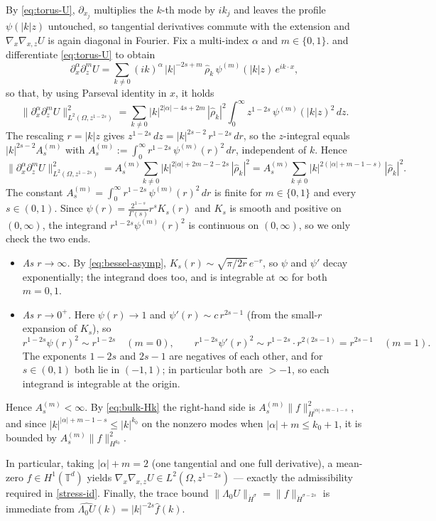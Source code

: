 \documentclass[12pt,a4paper,twoside]{article}
\newcommand{\Grad}{\nabla}
\numberwithin{equation}{section}%
\newcommand{\Lambdaz}{\Lambda_0}
\begin{document}
\begin{pf}[Proof of (i)]
By \eqref{eq:torus-U}, $\partial_{x_j}$ multiplies the $k$-th mode by $ik_j$ and leaves the profile
$\psi(|k|z)$ untouched, so tangential derivatives commute with the extension and
$\Grad_x\Grad_{x,z}U$ is again diagonal in Fourier. Fix a multi-index $\alpha$ and $m\in\{0,1\}$.
and differentiate \eqref{eq:torus-U} to obtain
\[
\partial_x^\alpha\partial_z^m U
= \sum_{k\neq0} (ik)^\alpha\,|k|^{-2s+m}\,\hat\rho_k\,\psi^{(m)}(|k|z)\,e^{ik\cdot x},
\]
so that, by using Parseval identity in $x$, it holds
\[
\|\partial_x^\alpha\partial_z^m U\|_{L^2(\Omega,z^{1-2s})}^2
= \sum_{k\neq0} |k|^{2|\alpha|-4s+2m}\,|\hat\rho_k|^2
\int_0^\infty z^{1-2s}\,\psi^{(m)}(|k|z)^2\,dz .
\]
The rescaling $r=|k|z$ gives $z^{1-2s}\,dz=|k|^{2s-2}\,r^{1-2s}\,dr$, so the $z$-integral equals
$|k|^{2s-2}A_s^{(m)}$ with $A_s^{(m)}:=\int_0^\infty r^{1-2s}\,\psi^{(m)}(r)^2\,dr$, independent of $k$.
Hence
\begin{equation}\label{eq:bulk-Hk}
	\|\partial_x^\alpha\partial_z^m U\|_{L^2(\Omega,z^{1-2s})}^2
	= A_s^{(m)}\sum_{k\neq0} |k|^{2|\alpha|+2m-2-2s}\,|\hat\rho_k|^2
	= A_s^{(m)}\sum_{k\neq0} |k|^{2(|\alpha|+m-1-s)}\,|\hat\rho_k|^2 .
\end{equation}
The constant $A_s^{(m)}=\int_0^\infty r^{1-2s}\,\psi^{(m)}(r)^2\,dr$ is finite for $m\in\{0,1\}$
and every $s\in(0,1)$. Since $\psi(r)=\tfrac{2^{1-s}}{\Gamma(s)}r^sK_s(r)$ and $K_s$ is smooth and
positive on $(0,\infty)$, the integrand $r^{1-2s}\psi^{(m)}(r)^2$ is continuous on $(0,\infty)$,
so we only check the two ends.
\begin{itemize}[leftmargin=*]
	\item \emph{As $r\to\infty$.} By \eqref{eq:bessel-asymp}, $K_s(r)\sim\sqrt{\pi/2r}\,e^{-r}$,
	so $\psi$ and $\psi'$ decay exponentially; the integrand does too, and is integrable at $\infty$
	for both $m=0,1$.
	\item \emph{As $r\to0^+$.} Here $\psi(r)\to1$ and $\psi'(r)\sim c\,r^{2s-1}$ (from the small-$r$
	expansion of $K_s$), so
	\[
	r^{1-2s}\psi(r)^2\sim r^{1-2s}\quad(m=0),
	\qquad
	r^{1-2s}\psi'(r)^2\sim r^{1-2s}\cdot r^{2(2s-1)}=r^{2s-1}\quad(m=1).
	\]
	The exponents $1-2s$ and $2s-1$ are negatives of each other, and for $s\in(0,1)$ both lie in
	$(-1,1)$; in particular both are $>-1$, so each integrand is integrable at the origin.
\end{itemize}
Hence $A_s^{(m)}<\infty$. By \eqref{eq:bulk-Hk} the right-hand side is
$A_s^{(m)}\|f\|_{\dot H^{|\alpha|+m-1-s}}^2$, and since $|k|^{|\alpha|+m-1-s}\le|k|^{k_0}$ on the
nonzero modes when $|\alpha|+m\le k_0+1$, it is bounded by $A_s^{(m)}\|f\|_{H^{k_0}}^2$.


In particular, taking $|\alpha|+m=2$ (one tangential and one full
derivative), a mean-zero $f\in H^1(\mathbb T^d)$ yields $\Grad_x\Grad_{x,z}U\in L^2(\Omega,z^{1-2s})$
--- exactly the admissibility required in \eqref{stress-id}. Finally, the trace bound
$\|\Lambdaz U\|_{\dot H^\sigma}=\|f\|_{\dot H^{\sigma-2s}}$ is immediate from
$\widehat{\Lambdaz U}(k)=|k|^{-2s}\hat f(k)$. 
\end{pf}
\end{document}

